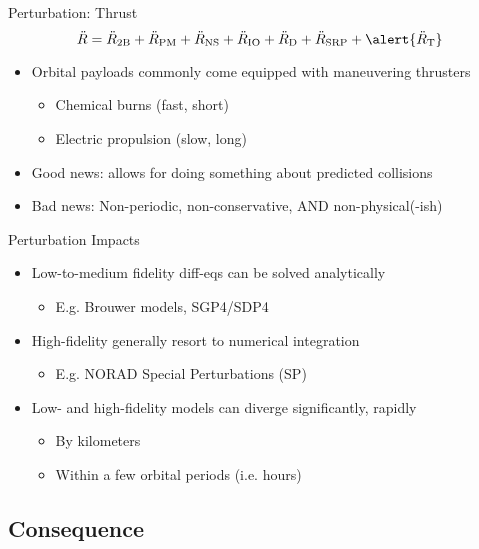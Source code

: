 \documentclass[pdf]{beamer}
\begin{document}
\begin{frame}{Perturbation: Thrust}
  \[ \ddot{R} = \ddot{R}_\text{2B} + \ddot{R}_\text{PM} + \ddot{R}_\text{NS}  + \ddot{R}_\text{IO} + \ddot{R}_\text{D} + \ddot{R}_\text{SRP} + \alert{\ddot{R}_\text{T}} \]

  \begin{itemize}
  \item Orbital payloads commonly come equipped with maneuvering thrusters
    \begin{itemize}
    \item Chemical burns (fast, short)
    \item Electric propulsion (slow, long)
    \end{itemize}
  \item Good news: allows for doing something about predicted collisions
  \item Bad news: Non-periodic, non-conservative, AND non-physical(-ish)
  \end{itemize}
\end{frame}

\begin{frame}{Perturbation Impacts}
  \begin{itemize}
  \item Low-to-medium fidelity diff-eqs can be solved analytically
    \begin{itemize}
      \item E.g. Brouwer models, SGP4/SDP4
    \end{itemize}
  \item High-fidelity generally resort to numerical integration
    \begin{itemize}
      \item E.g. NORAD Special Perturbations (SP)
    \end{itemize}
  \item Low- and high-fidelity models can diverge significantly, rapidly
    \begin{itemize}
    \item By kilometers
    \item Within a few orbital periods (i.e. hours)
    \end{itemize}
  \end{itemize}
\end{frame}

\subsection{Consequence}
\end{document}
